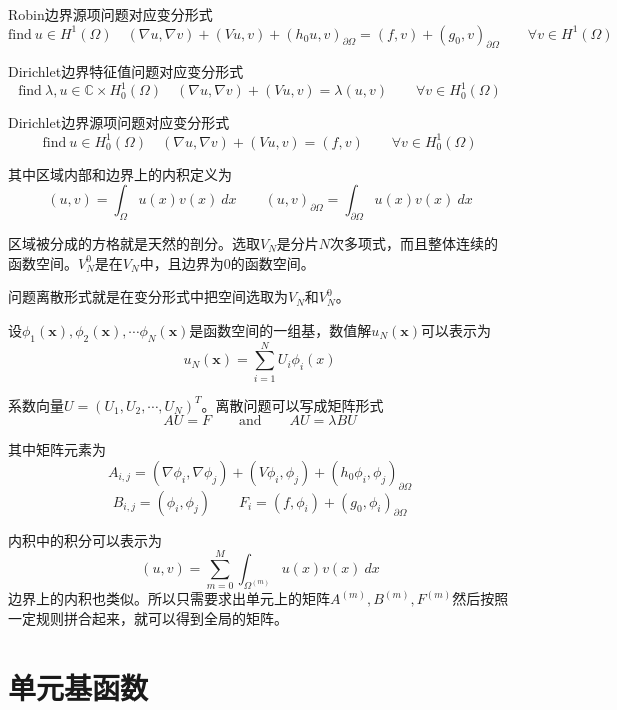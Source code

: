 \documentclass[UTF8,12pt]{article}
\begin{document}
Robin边界源项问题对应变分形式
\begin{equation}
\text{find} \ u \in H^1(\Omega) \quad (\nabla u, \nabla v) + (V u, v) + (h_0 u, v)_{\partial\Omega} = (f, v) + (g_0, v)_{\partial\Omega} \qquad \forall v \in  H^1(\Omega)
\end{equation}

Dirichlet边界特征值问题对应变分形式
\begin{equation}
\text{find} \ \lambda, u \in \mathbb{C} \times H_0^1(\Omega) \quad (\nabla u, \nabla v) + (V u, v) = \lambda (u, v) \qquad \forall v \in  H_0^1(\Omega)
\end{equation}

Dirichlet边界源项问题对应变分形式
\begin{equation}
\text{find} \ u \in H_0^1(\Omega) \quad (\nabla u, \nabla v) + (V u, v) = (f, v) \qquad \forall v \in  H_0^1(\Omega)
\end{equation}

其中区域内部和边界上的内积定义为
$$ (u, v) = \int_\Omega u(x) v(x) \ dx \qquad (u, v)_{\partial\Omega} = \int_{\partial\Omega} u(x) v(x) \ dx $$

区域被分成的方格就是天然的剖分。选取$V_N$是分片$N$次多项式，而且整体连续的函数空间。$V_N^0$是在$V_N$中，且边界为0的函数空间。

问题离散形式就是在变分形式中把空间选取为$V_N$和$V_N^0$。

设$\phi_1(\mathbf{x}), \phi_2(\mathbf{x}), \cdots \phi_N(\mathbf{x})$是函数空间的一组基，数值解$u_N(\mathbf{x})$可以表示为
$$ u_N(\mathbf{x}) = \sum_{i=1}^{N} U_i \phi_{i}(x) $$

系数向量$U = (U_1, U_2, \cdots, U_N)^T$。离散问题可以写成矩阵形式
\begin{equation}
A U = F \qquad \text{and} \qquad A U = \lambda B U
\end{equation}

其中矩阵元素为
$$ A_{i,j} = (\nabla \phi_i, \nabla \phi_j) + (V \phi_i, \phi_j) + (h_0 \phi_i, \phi_j)_{\partial\Omega} $$
$$ B_{i,j} = (\phi_i, \phi_j) \qquad F_i = (f, \phi_i) + (g_0, \phi_i)_{\partial\Omega} $$

内积中的积分可以表示为
$$ (u, v) = \sum_{m=0}^{M} \int_{\Omega^{(m)}} u(x) v(x) \ dx $$
边界上的内积也类似。所以只需要求出单元上的矩阵$A^{(m)},B^{(m)},F^{(m)}$然后按照一定规则拼合起来，就可以得到全局的矩阵。

\section{单元基函数}
\end{document}
